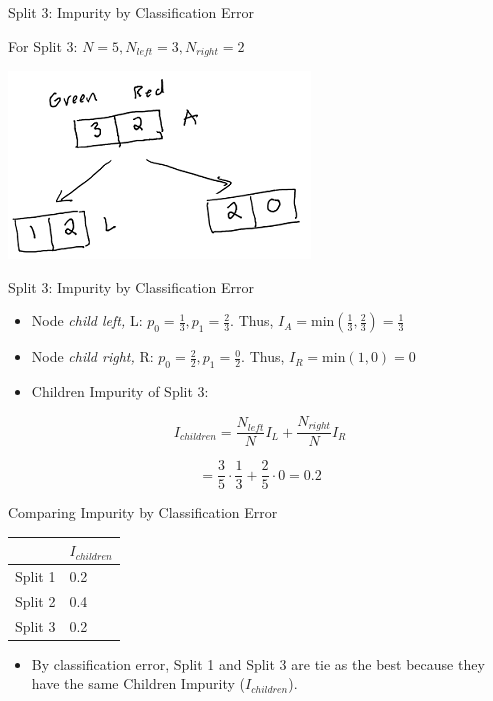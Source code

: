 \documentclass[
  ignorenonframetext,
]{beamer}
\providecommand{\tightlist}{%
  \setlength{\itemsep}{0pt}\setlength{\parskip}{0pt}}
\begin{document}
\begin{frame}{Split 3: Impurity by Classification Error}
\protect\hypertarget{split-3-impurity-by-classification-error}{}

For Split 3: \(N = 5, N_{left} =3, N_{right} = 2\)

\includegraphics{images2/im2.png}

\end{frame}

\begin{frame}{Split 3: Impurity by Classification Error}
\protect\hypertarget{split-3-impurity-by-classification-error-1}{}

\begin{itemize}
\item
  Node \emph{child left,} L: \(p_0 = \frac{1}{3}, p_1 = \frac{2}{3}\).
  Thus, \(I_{A} = \text{min}(\frac{1}{3}, \frac{2}{3}) = \frac{1}{3}\)
\item
  Node \emph{child right,} R: \(p_0 = \frac{2}{2}, p_1 = \frac{0}{2}\).
  Thus, \(I_{R} = \text{min}(1,0) = 0\)
\item
  Children Impurity of Split 3:
\end{itemize}

\[
I_{children} = \frac{N_{left}}{N}I_{L} + \frac{N_{right}}{N}I_{R}
\]

\[ =  \frac{3}{5} \cdot \frac{1}{3} + \frac{2}{5} \cdot 0 = 0.2\]

\end{frame}

\begin{frame}{Comparing Impurity by Classification Error}
\protect\hypertarget{comparing-impurity-by-classification-error}{}

\begin{longtable}[]{@{}ll@{}}
\toprule
& \(I_{children}\)\tabularnewline
\midrule
\endhead
Split 1 & 0.2\tabularnewline
Split 2 & 0.4\tabularnewline
Split 3 & 0.2\tabularnewline
\bottomrule
\end{longtable}

\begin{itemize}
\tightlist
\item
  By classification error, Split 1 and Split 3 are tie as the best
  because they have the same Children Impurity (\(I_{children}\)).
\end{itemize}

\end{frame}
\end{document}
